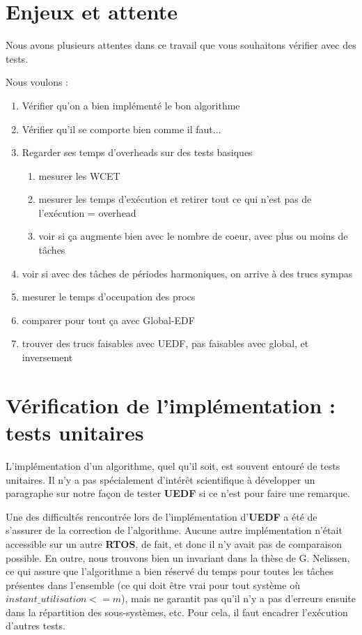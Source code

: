 \section{Enjeux et attente}

	Nous avons plusieurs attentes dans ce travail que vous souhaitons vérifier avec des tests.
	
	Nous voulons :
	\begin{enumerate}
		\item Vérifier qu'on a bien implémenté le bon algorithme
		\item Vérifier qu'il se comporte bien comme il faut...
		\item Regarder ses temps d'overheads sur des tests basiques
		\begin{enumerate}
			\item mesurer les WCET
			\item mesurer les temps d'exécution et retirer tout ce qui n'est pas de l'exécution = overhead
			\item voir si ça augmente bien avec le nombre de coeur, avec plus ou moins de tâches
		\end{enumerate}
		\item voir si avec des tâches de périodes harmoniques, on arrive à des trucs sympas
		\item mesurer le temps d'occupation des procs
		\item comparer pour tout ça avec Global-EDF
		\item trouver des trucs faisables avec UEDF, pas faisables avec global, et inversement
	\end{enumerate}
	

\section{Vérification de l'implémentation : tests unitaires}


	L'implémentation d'un algorithme, quel qu'il soit, est souvent entouré de tests unitaires. 
	Il n'y a pas spécialement d'intérêt scientifique à développer un paragraphe sur 
	notre façon de tester \textbf{UEDF} si ce n'est pour faire une remarque.\newline
		
	Une des difficultés rencontrée lors de l'implémentation d'\textbf{UEDF} a été de s'assurer de la correction de l'algorithme. 
	Aucune autre implémentation n'était accessible sur un autre \textbf{RTOS}, de fait, et donc il n'y avait pas de 
	comparaison possible. En outre, nous trouvons bien un invariant dans la thèse de G. Nelissen, ce qui assure 
	que l'algorithme a bien réservé du temps pour toutes les tâches présentes dans l'ensemble 
	(ce qui doit être vrai pour tout système où $instant\_utilisation <= m$), mais ne garantit pas 
	qu'il n'y a pas d'erreurs ensuite dans la répartition des sous-systèmes, etc. Pour cela, il faut encadrer 
	l'exécution d'autres tests. \newline
	
